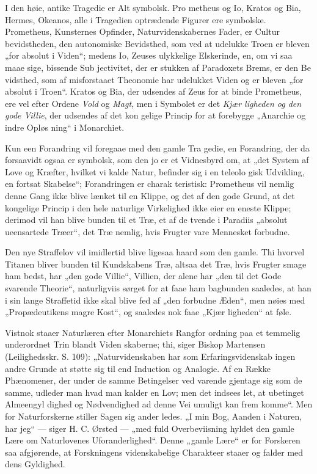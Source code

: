 \documentclass[12pt]{book}
\newcommand{\opage}[1]{\marginnote{\footnotesize\textit{[#1]}}}
\begin{document}
I den høie, antike Tragedie er Alt symbolsk. Pro\-%
metheus og Io, Kratos og Bia, Hermes, Okeanos, alle i
Tragedien optrædende Figurer ere symbolske. Prometheus,
Kunsternes Opfinder, Naturvidenskabernes Fader, er Cultur\-%
bevidstheden, den autonomiske Bevidsthed, som ved at udelukke
Troen er bleven „for absolut i Viden“; medens Io, Zeuses
ulykkelige Elskerinde, en, om vi saa maae sige, bissende Sub\-%
jectivitet, der er stukken af Paradoxets Brems, er den Be\-%
vidsthed, som af misforstaaet Theonomie har udelukket Viden
og er bleven „for absolut i Troen“. Kratos og Bia, der
udsendes af Zeus for at binde Prometheus, ere vel efter
Ordene \emph{Vold} og \emph{Magt}, men i Symbolet er det \emph{Kjær\-%
ligheden og den gode Villie}, der udsendes af det kon\-%
gelige Princip for at forebygge „Anarchie og indre Opløs\-%
ning“ i Monarchiet.

Kun een Forandring vil foregaae med den gamle Tra\-%
gedie, en Forandring, der da forsaavidt ogsaa er symbolsk,
som den jo er et Vidnesbyrd om, at „det System af Love
\opage{18}\setcounter{footnote}{0}%
og Kræfter, hvilket vi kalde Natur, befinder sig i en teleolo\-%
gisk Udvikling, en fortsat Skabelse“; Forandringen er charak\-%
teristisk: Prometheus vil nemlig denne Gang ikke blive lænket
til en Klippe, og det af den gode Grund, at det kongelige
Princip i den hele naturlige Virkelighed ikke eier en eneste
Klippe; derimod vil han blive bunden til et Træ, et af de
tvende i Paradiis „absolut ueensartede Træer“, det Træ
nemlig, hvis Frugter vare Mennesket forbudne.

Den nye Straffelov vil imidlertid blive ligesaa haard
som den gamle. Thi hvorvel Titanen bliver bunden til
Kundskabens Træ, altsaa det Træ, hvis Frugter smage ham
bedst, har „den gode Villie“, Villien, der alene har „den til
det Gode svarende Theorie“, naturligviis sørget for at faae
ham bagbunden saaledes, at han i sin lange Straffetid ikke
skal blive fed af „den forbudne Æden“, men nøies med
„Propædeutikens magre Kost“, og saaledes nok faae „Kjær\-%
ligheden“ at føle.

Vistnok staaer Naturlæren efter Monarchiets Rangfor\-%
ordning paa et temmelig underordnet Trin blandt Viden\-%
skaberne; thi, siger Biskop Martensen (Leilighedsskr. S. 109):
„Naturvidenskaben har som Erfaringsvidenskab ingen andre
Grunde at støtte sig til end Induction og Analogie. Af en
Række Phænomener, der under de samme Betingelser ved\-%
varende gjentage sig som de samme, udleder man hvad man
kalder en Lov; men det indsees let, at ubetinget Almeengyl\-%
dighed og Nødvendighed ad denne Vei umuligt kan frem\-%
komme“. Men for Naturforskerne stiller Sagen sig ander\-%
ledes. „I min Bog, Aanden i Naturen, har jeg“ --- siger
H. C. Ørsted --- „med fuld Overbeviisning hyldet den gamle
Lære om Naturlovenes Uforanderlighed“. Denne „gamle
Lære“ er for Forskeren saa afgjørende, at Forskningens
videnskabelige Charakteer staaer og falder med dens Gyldighed.
\end{document}
